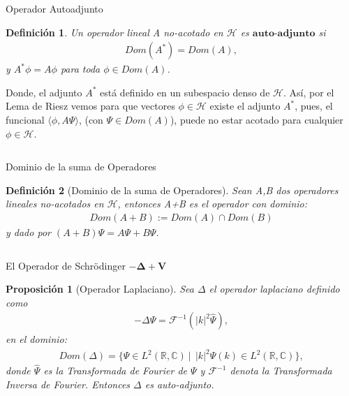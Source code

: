 \documentclass[aspectratio=1610]{beamer}
\newcommand*{\field}[1]{\mathbb{#1}}
\newtheorem*{defn}{Definición}
\newtheorem*{prop}{Proposición}
\begin{document}
\begin{frame}{Operador Autoadjunto}

\begin{defn}
    Un operador lineal A no-acotado en  $\mathcal{H}$ es $\textbf{auto-adjunto}$ si
    \begin{align*}
        Dom(A^{*}) = Dom(A),
    \end{align*}
    y $A^{*}\phi = A\phi$ para toda $\phi \in Dom(A)$.
    \label{def:Autoadjunto}
\end{defn}

\vspace{0.05\textheight}

 Donde, el adjunto $A^*$ está definido en un subespacio denso de $\mathcal{H}$. Así, por el Lema de Riesz vemos para que vectores $\phi\in\mathcal{H}$ existe el adjunto $A^*$,
 pues, el funcional $\langle\phi,A\Psi\rangle$, (con $\Psi\in Dom(A)$), puede no estar acotado para cualquier $\phi\in\mathcal{H}$.
   
\begin{columns}
\column{37em}
\end{columns}
\end{frame}

\begin{frame}{Dominio de la suma de Operadores}

\begin{defn}[Dominio de la suma de Operadores]
    Sean A,B dos operadores lineales no-acotados en $\mathcal{H}$, entonces A+B es el operador con dominio:
    \begin{align*}
        Dom(A+B) := Dom(A)\cap Dom(B)
    \end{align*}
    y dado por $(A+B)\Psi = A\Psi + B\Psi$.
    \label{def:DomOPADJS}
\end{defn}

\begin{columns}
\column{37em}
\end{columns}
\end{frame}



\begin{frame}{El Operador de Schrödinger $\boldsymbol{-\Delta + V}$}

\begin{prop}[Operador Laplaciano]
    Sea $\Delta$ el operador laplaciano definido como
    \begin{align*}
        -\Delta\Psi = \mathcal{F}^{-1}(|k|^{2} \hat{\Psi}),
    \end{align*}
    en el dominio:
    \begin{align*} Dom(\Delta) = \{\Psi\in L^{2}(\field{R},\field{C}) \:|\:
       \: |k|^{2}\hat{\Psi}(k) \in L^{2}(\field{R},\field{C})\},
    \end{align*}
donde $\hat{\Psi}$ es la Transformada de Fourier de $\Psi$ y $\mathcal{F}^{-1}$ denota la Transformada Inversa de Fourier. Entonces $\Delta$ es auto-adjunto.
\end{prop}    
    
\end{frame}
\end{document}
